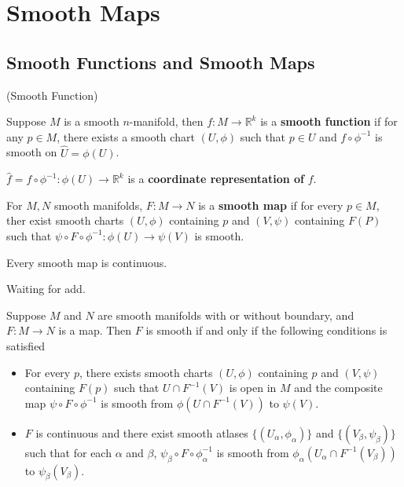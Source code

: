 \section{Smooth Maps}

\subsection{Smooth Functions and Smooth Maps}

\begin{definition}(Smooth Function)\par
    Suppose $M$ is a smooth $n$-manifold, then $f:M\to\mathbb{R}^k$ is a \textbf{smooth function} if for any $p\in M$, there exists a smooth chart $(U,\phi)$ such that $p\in U$ and $f\circ \phi^{-1}$ is smooth on $\hat{U} = \phi(U)$.\par
    $\hat{f} = f\circ \phi^{-1} : \phi(U) \to \mathbb{R}^k$ is a \textbf{coordinate representation of }$f$.
\end{definition}

\begin{definition}
    For $M,N$ smooth manifolds, $F:M\to N$ is a \textbf{smooth map} if for every $p\in M$, ther exist smooth charts $(U,\phi)$ containing $p$ and $(V,\psi)$ containing $F(P)$ such that $\psi\circ F\circ \phi^{-1}:\phi(U)\to \psi(V)$ is smooth.
\end{definition}
\begin{proposition}
    Every smooth map is continuous.
\end{proposition}
\Pf\par
    Waiting for add.

\begin{proposition}
    Suppose $M$ and $N$ are smooth manifolds with or without boundary, and $F:M\to N$ is a map. Then $F$ is smooth if and only if the following conditions is satisfied
    \begin{itemize}
        \item For every $p$, there exists smooth charts $(U,\phi)$ containing $p$ and $(V,\psi)$ containing $F(p)$ such that $U\cap F^{-1}(V)$ is open in $M$ and the composite map $\psi\circ F\circ \phi^{-1}$ is smooth from $\phi(U\cap F^{-1}(V))$ to $\psi(V)$.
        \item $F$ is continuous and there exist smooth atlases $\{(U_{\alpha}, \phi_{\alpha})\}$ and $\{(V_{\beta},\psi_{\beta})\}$ such that for each $\alpha$ and $\beta$, $\psi_{\beta} \circ F \circ \phi_{\alpha}^{-1}$ is smooth from $\phi_{\alpha}(U_{\alpha} \cap F^{-1}(V_{\beta}))$ to $\psi_{\beta}(V_{\beta})$.
    \end{itemize}
\end{proposition}


